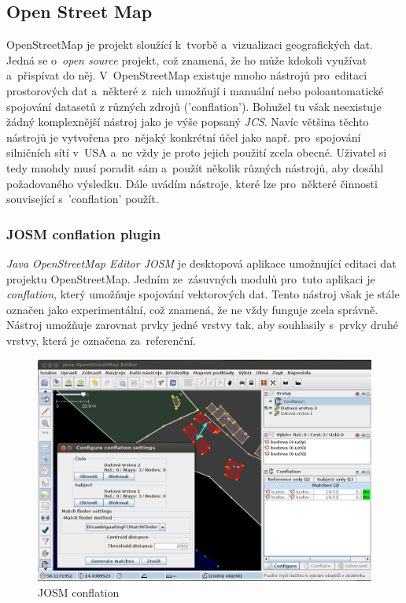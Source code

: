 
\subsection{Open Street Map}
\label{OSM}

OpenStreetMap je projekt sloužící k~tvorbě a~vizualizaci geografických dat. Jedná se o~\textit{open source} projekt, což znamená, že ho může kdokoli využívat a~přispívat do něj.
V~OpenStreetMap existuje mnoho nástrojů pro~editaci prostorových dat a~některé z~nich umožňují i manuální nebo poloautomatické spojování datasetů z různých zdrojů ('conflation').
Bohužel tu však neexistuje žádný komplexnější nástroj jako je výše popsaný \textit{JCS}. Navíc většina těchto nástrojů je vytvořena pro~nějaký konkrétní účel jako např. 
pro~spojování silničních sítí v~USA a~ne vždy je proto jejich použití zcela obecné. Uživatel si tedy mnohdy musí poradit sám a~použít několik různých nástrojů, aby dosáhl
požadovaného výsledku. Dále uvádím nástroje, které lze pro~některé činnosti související s~'conflation' použít. 

\subsubsection{JOSM conflation plugin}

\textit{Java OpenStreetMap Editor JOSM} je desktopová aplikace umožnující editaci dat projektu OpenStreetMap. Jedním ze~zásuvných modulů pro~tuto aplikaci je \textit{conflation},
který umožňuje spojování vektorových dat. Tento nástroj však je stále označen jako experimentální, což znamená, že ne vždy funguje zcela správně. Nástroj umožňuje zarovnat
prvky jedné vrstvy tak, aby souhlasily s~prvky druhé vrstvy, která je označena za~referenční. 

\label{josmpic}
  \begin{figure}[hbt]
    \centering
      \includegraphics[width=350pt]{./pictures/josm.png}
      \caption{JOSM conflation}
      \label{fig:josm}
  \end{figure} 

